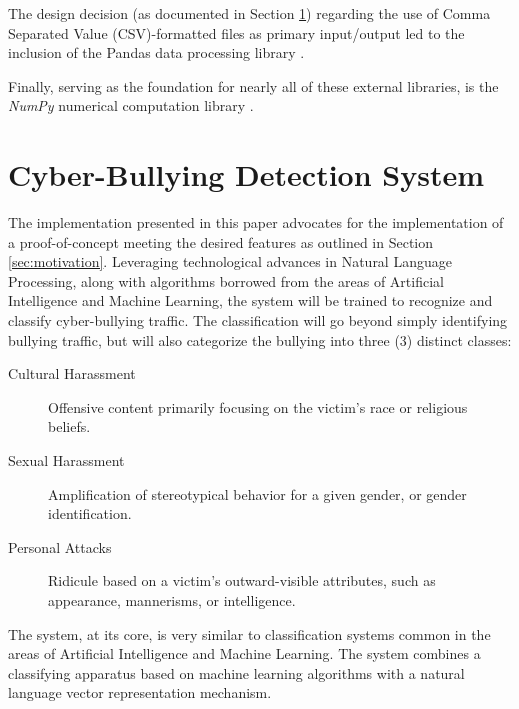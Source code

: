\documentclass[conference]{sig-alternate-05-2015}
\begin{document}
The design decision (as documented in Section \ref{sec:design}) regarding the
use of Comma Separated Value (CSV)-formatted files as primary input/output led
to the inclusion of the Pandas data processing library
\cite{mckinney-proc-scipy-2010}.

Finally, serving as the foundation for nearly all of these external libraries,
is the \textit{NumPy} numerical computation library \cite{oliphant2006guide}.

\section{Cyber-Bullying Detection System}\label{sec:design}
The implementation presented in this paper advocates for the implementation of a
proof-of-concept meeting the desired features as outlined in Section \ref{sec:motivation}.
Leveraging technological advances in Natural
Language Processing, along with algorithms borrowed from the areas of Artificial
Intelligence and Machine Learning, the system will be trained to recognize and
classify cyber-bullying traffic. The classification will go beyond simply
identifying bullying traffic, but will also categorize the bullying into three
(3) distinct classes:
\begin{description}
    \item[Cultural Harassment] Offensive content primarily focusing on the
    victim's race or religious beliefs.
    \item[Sexual Harassment] Amplification of stereotypical behavior for a given
    gender, or gender identification.
    \item[Personal Attacks] Ridicule based on a victim's outward-visible
    attributes, such as appearance, mannerisms, or intelligence.
\end{description}

The system, at its core, is very similar to classification systems
common in the areas of Artificial Intelligence and Machine Learning. The system
combines a classifying apparatus based on machine learning algorithms with a
natural language vector representation mechanism.
\end{document}
